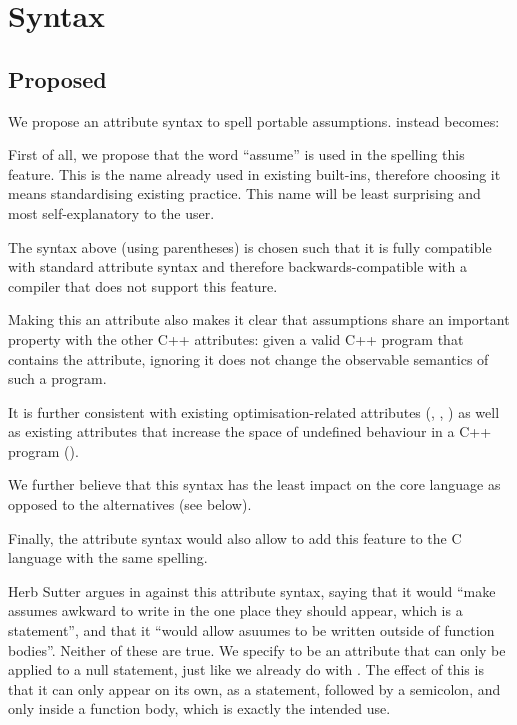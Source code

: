 

\section{Syntax}


\subsection{Proposed}

We propose an attribute syntax to spell portable assumptions.  instead becomes:

\forceindent
{}

First of all, we propose that the word ``assume'' is used in the spelling this feature. This is the name already used in existing built-ins, therefore choosing it means standardising existing practice. This name will be least surprising and most self-explanatory to the user.

The syntax above (using parentheses) is chosen such that it is fully compatible with standard attribute syntax and therefore backwards-compatible with a compiler that does not support this feature. 

Making this an attribute also makes it clear that assumptions share an important property with the other C++ attributes: given a valid C++ program that contains the attribute, ignoring it does not change the observable semantics of such a program.

It is further consistent with existing optimisation-related attributes (\tcode{[[likely]]}, \tcode{[[unlikely]]}, ) as well as existing attributes that increase the space of undefined behaviour in a C++ program (\tcode{[[noreturn]]}).

We further believe that this syntax has the least impact on the core language as opposed to the alternatives (see below).

Finally, the attribute syntax would also allow to add this feature to the C language with the same spelling.

Herb Sutter argues in \cite{P2064R0} against this attribute syntax, saying that it would ``make assumes awkward to write in the one place they should appear, which is a statement'', and that it ``would allow asuumes to be written outside of function bodies''. Neither of these are true. We specify  to be an attribute that can only be applied to a null statement, just like we already do with \tcode{[[fallthrough]]}. The effect of this is that it can only appear on its own, as a statement, followed by a semicolon, and only inside a function body, which is exactly the intended use.

